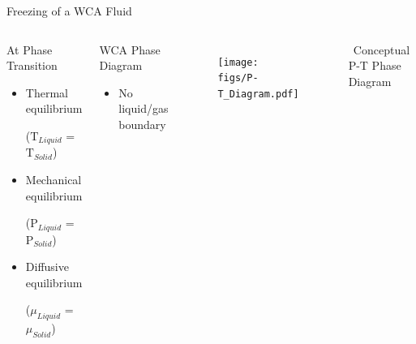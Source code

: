 \documentclass{beamer}
\begin{document}
\begin{frame}{Freezing of a WCA Fluid}
	\begin{columns}[t]
	    \vspace{-0.5em}
         \begin{block}{At Phase Transition}
		     \begin{itemize}
				\item Thermal equilibrium 
				
				($\text{T}_{Liquid}$ = $\text{T}_{Solid}$)
			    \item Mechanical equilibrium 
			    
			    ($\text{P}_{Liquid}$ = $\text{P}_{Solid}$)
				\item Diffusive equilibrium 
				
				($\mu_{Liquid}$ = $\mu_{Solid}$)
			\end{itemize}		
		\end{block}	
		\begin{block}{WCA Phase Diagram}
		     \begin{itemize}
				\item No liquid/gas boundary				
			  \end{itemize}				 
		\end{block}	
	    \vspace{-1.5em}
		\begin{figure}
            \centering
            \texttt{[image: figs/P-T\_Diagram.pdf]}
         \end{figure} 
	    \vspace{-1em}                  
         $~~$Conceptual P-T Phase Diagram
	\end{columns}
    \vspace{+1em}	
\end{frame}



				
\end{document}
